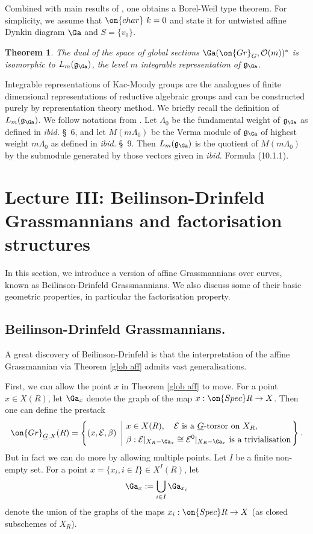 \documentclass[]{pcmi}
\theoremstyle{plain}
\newtheorem{thm}[equation]{Theorem}
\theoremstyle{remark}
\theoremstyle{definition}
\newcommand{\frakg}{{\mathfrak g}}
\newcommand{\mE}{{\mathcal E}}
\newcommand{\mO}{{\mathcal O}}
\newcommand{\cha}{{\on{char}}}
\newcommand{\Gr}{{\on{Gr}}}
\newcommand{\Spec}{\on{Spec}}
\begin{document}
Combined with main results of \cite{Ku,Ma}, one obtains a Borel-Weil type theorem. For simplicity, we assume that $\cha\ k=0$ and state it for untwisted affine Dynkin diagram $\Ga$ and $S=\{v_0\}$.
\begin{thm}\label{Borel-Weil}
The dual of the space of global sections $\Ga(\Gr_G,\mO(m))^*$ is isomorphic to $L_m(\frakg_\Ga)$, the level $m$ integrable representation of $\frakg_{\Ga}$.
\end{thm}
Integrable representations of Kac-Moody groups are the analogues of finite dimensional representations of reductive algebraic groups and can be constructed purely by representation theory method.
We briefly recall the definition of $L_m(\frakg_\Ga)$. We follow notations from \cite{Kac}. Let $\Lambda_0$ be the fundamental weight of $\frakg_\Ga$ as defined in \emph{ibid.} \S\ 6, and let $M(m\Lambda_0)$ be the Verma module of $\frakg_\Ga$ of highest weight $m\Lambda_0$ as defined in \emph{ibid.} \S\ 9. Then $L_m(\frakg_\Ga)$ is the quotient of $M(m\Lambda_0)$ by the submodule generated by those vectors given in \emph{ibid.} Formula (10.1.1). 





\section{Lecture III: Beilinson-Drinfeld Grassmannians and factorisation structures}\label{Lecture III}
In this section, we introduce a version of affine Grassmannians over curves, known as Beilinson-Drinfeld Grassmannians. We also discuss some of their basic geometric properties, in particular the factorisation property. 





\subsection{Beilinson-Drinfeld Grassmannians.}
A great discovery of
Beilinson-Drinfeld is that the interpretation of the affine Grassmannian via Theorem \ref{glob aff} admits vast generalisations.

First, we can allow the point $x$ in Theorem \ref{glob aff} to move. For a point $x\in X(R)$, let $\Ga_x$ denote the graph of the map $x:\Spec R\to X$. Then one can define the prestack
\[\Gr_{\underline G, X}(R)=\left\{(x,\mE,\beta)\ \left|\ \begin{split}&x\in X(R),\quad \mE \mbox{ is a } \underline{G}\mbox{-torsor on } X_R, \\
& \beta: \mE|_{X_R-\Ga_x}\cong \mE^0|_{X_R-\Ga_x} \mbox{ is a trivialisation}\end{split}\right.\right\}.\]
But in fact we can do more by allowing multiple points. Let $I$ be a finite non-empty set. For a point $x=\{x_i,i\in I\}\in X^I(R)$, let $$\Ga_x:=\bigcup_{i\in I} \Ga_{x_i}$$ denote the union of the graphs of the maps $x_i: \Spec R\to X$ (as closed subschemes of $X_R$).
\end{document}
